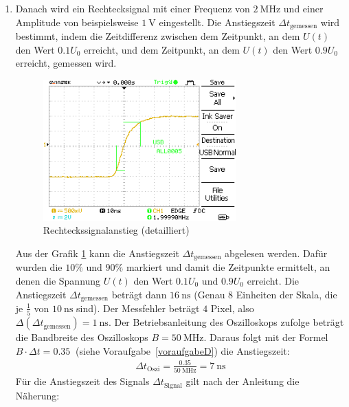 \documentclass{article}
\begin{document}
\begin{enumerate}[label=\alph*]
         \item Danach wird ein Rechtecksignal mit einer Frequenz von $\SI{2}{\mega\hertz}$ und einer Amplitude von beispielsweise $\SI{1}{\volt}$ eingestellt. Die Anstiegszeit $\Delta t_\mathrm{gemessen}$ wird bestimmt, indem die Zeitdifferenz zwischen dem Zeitpunkt, an dem $U(t)$ den Wert $0.1 U_0$ erreicht, und dem Zeitpunkt, an dem $U(t)$ den Wert $0.9 U_0$ erreicht, gemessen wird.

         \begin{figure}[H]
             \centering
             \includegraphics[width=0.7\textwidth]{MesswerteVersuch0/A0005DS.png}
             \caption{Rechteckssignalanstieg (detailliert)}
             \label{fig:A0005DS}
         \end{figure}
         Aus der Grafik \ref{fig:A0005DS} kann die Anstiegszeit $\Delta t_\mathrm{gemessen}$ abgelesen werden. Dafür wurden die $10\%$ und $90\%$ markiert und damit die Zeitpunkte ermittelt, an denen die Spannung $U(t)$ den Wert $0.1 U_0$ und $0.9 U_0$ erreicht. Die Anstiegszeit $\Delta t_\mathrm{gemessen}$ beträgt dann $\SI{16}{\nano\second}$ (Genau $8$ Einheiten der Skala, die je $\frac{1}{5}$ von $\SI{10}{\nano\second}$ sind). Der Messfehler beträgt $4$ Pixel, also $\Delta(\Delta t_\mathrm{gemessen}) =  \SI{1}{\nano\second}$. Der Betriebsanleitung des Oszilloskops \cite{oszibedienungsanleitung} zufolge beträgt die Bandbreite des Oszilloskops $B = \SI{50}{\mega\hertz}$. Daraus folgt mit der Formel $B \cdot \Delta t = \SI{0.35}{}$ (siehe Voraufgabe~\ref{voraufgabeD}) die Anstiegszeit:
         \begin{align*}
             \Delta t_\mathrm{Oszi} = \frac{0.35}{\SI{50}{\mega\hertz}} = \SI{7}{\nano\second}
         \end{align*}
         Für die Anstiegszeit des Signals $\Delta t_\mathrm{Signal}$ gilt nach der Anleitung\cite{anleitung} die Näherung:
         \begin{align*}

\end{align*}
\end{enumerate}
\end{document}
